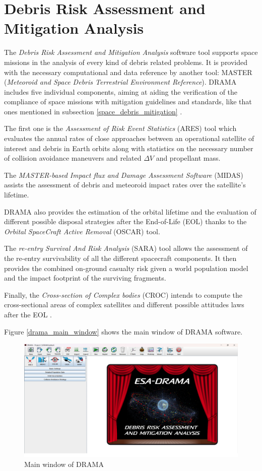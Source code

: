 \section{Debris Risk Assessment and Mitigation Analysis} \label{drama_section}
The \textit{Debris Risk Assessment and Mitigation Analysis} software tool supports space missions in the analysis of every kind of debris related problems.
It is provided with the necessary computational and data reference by another tool: MASTER (\textit{Meteoroid and Space Debris Terrestrial Environment Reference}).
DRAMA includes five individual components, aiming at  aiding the verification of the compliance of space missions with mitigation guidelines and standards, like that ones mentioned in subsection \ref{space_debris_mitigation} \cite{braun2013drama}.

The first one is the \textit{Assessment of Risk Event Statistics} (ARES) tool which evaluates the annual rates of close approaches between an operational satellite of interest and debris in Earth orbits along with statistics on the necessary number of collision avoidance maneuvers and related $\Delta V$ and propellant mass.

The \textit{MASTER-based Impact flux and Damage Assessment Software} (MIDAS) assists the assessment of debris and meteoroid impact rates over the satellite's lifetime.

DRAMA also provides the estimation of the orbital lifetime and the evaluation of different possible disposal strategies after the End-of-Life (EOL) thanks to the \textit{Orbital SpaceCraft Active Removal} (OSCAR) tool.

The \textit{re-entry Survival And Risk Analysis} (SARA) tool allows the assessment of the re-entry survivability of all the different spacecraft components. 
It then provides the combined on-ground casualty risk given a world population model and the impact footprint of the surviving fragments.  

Finally, the \textit{Cross-section of Complex bodies} (CROC) intends to compute the cross-sectional areas of complex satellites and different possible attitudes laws after the EOL \cite{braun2020drama}.

Figure \ref{drama_main_window} shows the main window of DRAMA software.
\begin{figure}[h]
    \centering
    \includegraphics[scale=0.25]{img/drama_mainwindow.png}
    \caption{Main window of DRAMA}
    \label{drama_main_window_fig}
\end{figure}